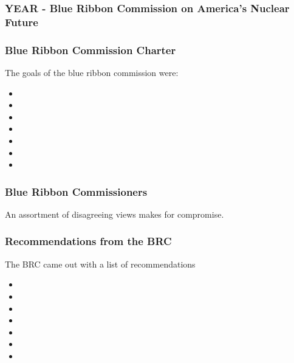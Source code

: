 
\begin{frame}[ctb!]
    \frametitle{YEAR - Blue Ribbon Commission on America's Nuclear Future}
    
  \end{frame}
\begin{frame}[ctb!]
    \frametitle{Blue Ribbon Commission Charter}
    The goals of the blue ribbon commission were:
    \begin{itemize}
      \item <++>
      \item <++>
      \item <++>
      \item <++>
      \item <++>
      \item <++>
      \item <++>
    \end{itemize}

  \end{frame}

\begin{frame}[ctb!]
    \frametitle{Blue Ribbon Commissioners}
    An assortment of disagreeing views makes for compromise.
  \end{frame}

\begin{frame}[ctb!]
    \frametitle{Recommendations from the BRC}
    The BRC came out with a list of recommendations
    \begin{itemize}
      \item <++>
      \item <++>
      \item <++>
      \item <++>
      \item <++>
      \item <++>
      \item <++>
    \end{itemize}
  \end{frame}


